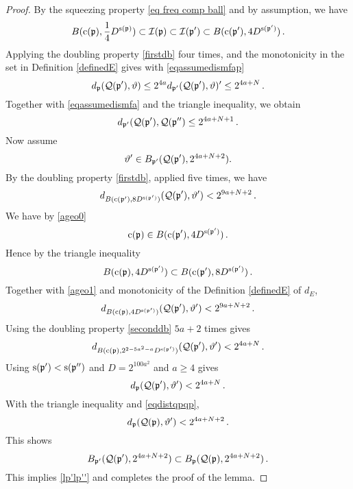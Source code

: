 \begin{proof}
    By the squeezing property \eqref{eq freq comp ball}
    and by assumption, we have
\begin{equation}\label{ageo0}
   B(\mathrm{c}(\mathfrak p), \frac 14 D^{\mathrm{s}(\mathfrak p)})\subset \mathcal{I}(\mathfrak p)\subset \mathcal{I}(\mathfrak p')
    \subset B(\mathrm{c}(\mathfrak p'),  4D^{\mathrm{s}(\mathfrak p')})\, .
\end{equation}
    Applying the doubling property \eqref{firstdb} four times, and the monotonicity in
    the set in Definition \eqref{definedE} gives with
    \eqref{eqassumedismfap}
\begin{equation}
     d_{\mathfrak p}(\mathcal{Q}(\mathfrak p'),\vartheta)
     \le 2^{4a} d_{\mathfrak p'}(\mathcal{Q}(\mathfrak p'),\vartheta)'
     \le  2^{4a+N} \, .
\end{equation}
Together with \eqref{eqassumedismfa} and the triangle inequality, we obtain
\begin{equation}\label{eqdistqpqp}
    d_{\mathfrak p'}(\mathcal{Q}(\mathfrak p'),\mathcal{Q}(\mathfrak p'')\le 2^{4a+N+1}  \, .
\end{equation}
Now assume
\begin{equation}
    \vartheta'\in B_{\mathfrak p'}(\mathcal{Q}(\mathfrak p'),2^{4a+N+2}).
\end{equation}
By the doubling property \eqref{firstdb}, applied five times, we have
\begin{equation}\label{ageo1}    d_{B(\mathrm{c}(\mathfrak p'),8D^{\mathrm{s}(\mathfrak p')})}(\mathcal{Q}(\mathfrak p'),\vartheta') < 2^{9a+N+2}\, .
\end{equation}
We have by \eqref{ageo0}
\begin{equation}
 \mathrm{c}(\mathfrak p)\in
B(\mathrm{c}(\mathfrak p'),4D^{\mathrm{s}(\mathfrak p')})\, .
\end{equation}
Hence by the triangle inequality
\begin{equation}
 B(\mathrm{c}(\mathfrak p), 4D^{\mathrm{s}(\mathfrak p')})
 \subset
B(\mathrm{c}(\mathfrak p'),8D^{\mathrm{s}(\mathfrak p')})\, .
\end{equation}
Together with \eqref{ageo1} and   monotonicity of the Definition \eqref{definedE}
of $d_E$,
\begin{equation}
    d_{B(\mathrm{c}(\mathfrak p),4D^{\mathrm{s}(\mathfrak p')})}(\mathcal{Q}(\mathfrak p'),\vartheta') < 2^{9a+N+2}\, .
\end{equation}
Using the doubling property \eqref{seconddb} $5a+2$ times  gives
\begin{equation}
    d_{B(\mathrm{c}(\mathfrak p),2^{2-5a^2-a}D^{\mathrm{s}(\mathfrak p')})}(\mathcal{Q}(\mathfrak p'),\vartheta') < 2^{4a+N}\, .
\end{equation}
Using $\mathrm{s}(\mathfrak p')<\mathrm{s}(\mathfrak p'')$ and $D=2^{100a^2}$ and $a\ge 4$ gives
\begin{equation}
    d_{\mathfrak p}(\mathcal{Q}(\mathfrak p'),\vartheta') < 2^{4a+N}\, .
\end{equation}
With the triangle inequality and \eqref{eqdistqpqp},
\begin{equation}
    d_{\mathfrak p}(\mathcal{Q}(\mathfrak p),\vartheta') < 2^{4a+N+2}\, .
\end{equation}
This shows
\begin{equation}
B_{\mathfrak p'}(\mathcal{Q}(\mathfrak p'),2^{4a+N+2})\subset    B_{\mathfrak p}(\mathcal{Q}(\mathfrak p),2^{4a+N+2})\, .
\end{equation}
This implies  \eqref{lp'lp''} and completes the proof of the lemma.

\end{proof}


